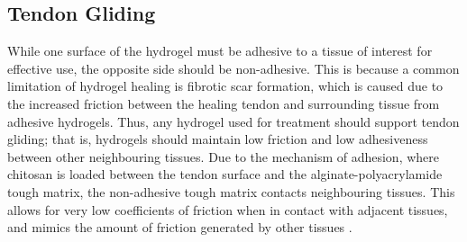 \subsection{Tendon Gliding}
While one surface of the hydrogel must be adhesive to a tissue of interest for effective use, the opposite side should be non-adhesive. This is because a common limitation of hydrogel healing is fibrotic scar formation, which is caused due to the increased friction between the healing tendon and surrounding tissue from adhesive hydrogels. Thus, any hydrogel used for treatment should support tendon gliding; that is, hydrogels should maintain low friction and low adhesiveness between other neighbouring tissues. Due to the mechanism of adhesion, where chitosan is loaded between the tendon surface and the alginate-polyacrylamide tough matrix, the non-adhesive tough matrix contacts neighbouring tissues. This allows for very low coefficients of friction when in contact with adjacent tissues, and mimics the amount of friction generated by other tissues \autocite{freedmanEnhancedTendonHealing2022}.
